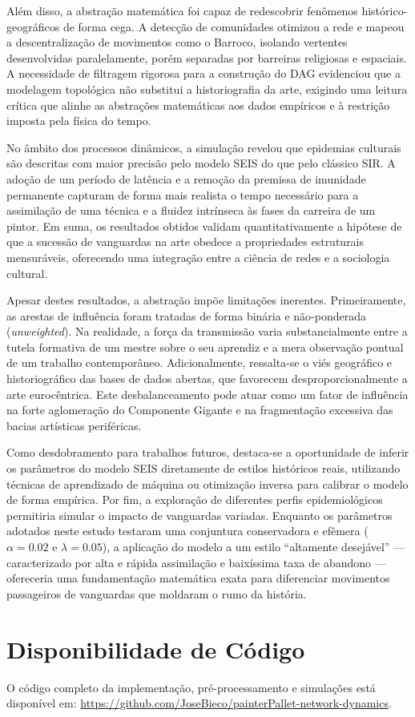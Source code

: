 \documentclass[12pt,a4paper]{article}
\begin{document}
Além disso, a abstração matemática foi capaz de redescobrir fenômenos histórico-geográficos de forma cega. A detecção de comunidades otimizou a rede e mapeou a descentralização de movimentos como o Barroco, isolando vertentes desenvolvidas paralelamente, porém separadas por barreiras religiosas e espaciais. A necessidade de filtragem rigorosa para a construção do DAG evidenciou que a modelagem topológica não substitui a historiografia da arte, exigindo uma leitura crítica que alinhe as abstrações matemáticas aos dados empíricos e à restrição imposta pela física do tempo.

No âmbito dos processos dinâmicos, a simulação revelou que epidemias culturais são descritas com maior precisão pelo modelo SEIS do que pelo clássico SIR. A adoção de um período de latência e a remoção da premissa de imunidade permanente capturam de forma mais realista o tempo necessário para a assimilação de uma técnica e a fluidez intrínseca às fases da carreira de um pintor. Em suma, os resultados obtidos validam quantitativamente a hipótese de que a sucessão de vanguardas na arte obedece a propriedades estruturais mensuráveis, oferecendo uma integração entre a ciência de redes e a sociologia cultural.

Apesar destes resultados, a abstração impõe limitações inerentes. Primeiramente, as arestas de influência foram tratadas de forma binária e não-ponderada (\textit{unweighted}). Na realidade, a força da transmissão varia substancialmente entre a tutela formativa de um mestre sobre o seu aprendiz e a mera observação pontual de um trabalho contemporâneo. Adicionalmente, ressalta-se o viés geográfico e historiográfico das bases de dados abertas, que favorecem desproporcionalmente a arte eurocêntrica. Este desbalanceamento pode atuar como um fator de influência na forte aglomeração do Componente Gigante e na fragmentação excessiva das bacias artísticas periféricas.

Como desdobramento para trabalhos futuros, destaca-se a oportunidade de inferir os parâmetros do modelo SEIS diretamente de estilos históricos reais, utilizando técnicas de aprendizado de máquina ou otimização inversa para calibrar o modelo de forma empírica. Por fim, a exploração de diferentes perfis epidemiológicos permitiria simular o impacto de vanguardas variadas. Enquanto os parâmetros adotados neste estudo testaram uma conjuntura conservadora e efêmera ($\alpha = 0.02$ e $\lambda = 0.05$), a aplicação do modelo a um estilo ``altamente desejável'' — caracterizado por alta e rápida assimilação e baixíssima taxa de abandono — ofereceria uma fundamentação matemática exata para diferenciar movimentos passageiros de vanguardas que moldaram o rumo da história.

\section*{Disponibilidade de Código}
O código completo da implementação, pré-processamento e simulações está disponível em: \url{https://github.com/JoseBieco/painterPallet-network-dynamics}.

\renewcommand{\refname}{Referências}


\end{document}
